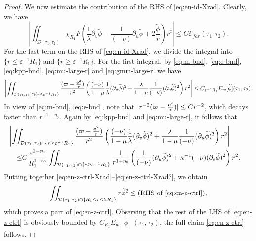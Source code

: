 \documentclass[10pt, reqno]{amsart}
\theoremstyle{definition}
\theoremstyle{remark}
\theoremstyle{conjecture}
\numberwithin{equation}{section}
\newcommand{\abs}[1]{\vert#1\vert}
\newcommand{\set}[1]{\{#1\}}
\newcommand{\rd}{\partial}
\newcommand{\0}{\emptyset}
\newcommand{\veps}{\varepsilon}
\newcommand{\kpp}{\kappa}
\newcommand{\lmb}{\lambda}
\newcommand{\bfe}{{\bf e}}
\newcommand{\calD}{\mathcal D}
\newcommand{\calE}{\mathcal E}
\newcommand{\dur}{\nu}
\newcommand{\dvr}{\lmb}
\newcommand{\e}{\bfe}							%
\newcommand{\phibg}{\overline{\phi}}				%
\newcommand{\phidf}{\widetilde{\phi}}				%
\newcommand{\Abs}[1]{\left\vert #1 \right\vert}
\begin{document}
\begin{proof}
We now estimate the contribution of the RHS of \eqref{eq:en-id-Xrad}. Clearly, we have
\begin{equation} \label{eq:en-z-ctrl-Xrad1}
	\Abs{\iint_{\calD(\tau_{1}, \tau_{2})} \chi_{R_{1}} F \left( \frac{1}{\dvr} \rd_{v} \phidf - \frac{1}{(-\dur)} \rd_{u} \phidf + 2 \frac{\phidf}{r} \right) r^{2} }
	\leq C \calE_{far}(\tau_{1}, \tau_{2}).
\end{equation}
For the last term on the RHS of \eqref{eq:en-id-Xrad}, we divide the integral into $\set{r \leq \veps^{-1} R_{1}}$ and $\set{r \geq \veps^{-1} R_{1}}$. For the first integral, by \eqref{eq:m-bnd}, \eqref{eq:e-bnd}, \eqref{eq:kpp-bnd}, \eqref{eq:mu-large-r} and \eqref{eq:gmm-large-r} we have
\begin{equation} \label{eq:en-z-ctrl-Xrad2}
	\Abs{\iint_{\calD(\tau_{1}, \tau_{2}) \cap \set{r \leq \veps^{-1} R_{1}}} \frac{(\varpi - \frac{\e^{2}}{r})}{r^{2}} \left( \frac{(-\dur)}{1-\mu} \frac{1}{\dvr} (\rd_{v} \phidf)^{2} + \frac{\dvr}{1-\mu} \frac{1}{(-\dur)} (\rd_{u} \phidf)^{2} \right) r^{2}}
	\leq C_{\veps^{-1} R_{1}} E_{w}[\phidf](\tau_{1}, \tau_{2}).
\end{equation}
In view of \eqref{eq:m-bnd}, \eqref{eq:e-bnd}, note that $\abs{r^{-2} (\varpi - \frac{\e^{2}}{r})} \leq C r^{-2}$, which decays faster than $r^{-1-\eta_{0}}$. Again by \eqref{eq:kpp-bnd} and \eqref{eq:mu-large-r}, it follows that
\begin{equation} \label{eq:en-z-ctrl-Xrad3}
\begin{aligned} 
& \hskip-2em
	\Abs{\iint_{\calD(\tau_{1}, \tau_{2}) \cap \set{r \geq \veps^{-1} R_{1}}} \frac{(\varpi - \frac{\e^{2}}{r})}{r^{2}} \left( \frac{(-\dur)}{1-\mu} \frac{1}{\dvr} (\rd_{v} \phidf)^{2} + \frac{\dvr}{1-\mu} \frac{1}{(-\dur)} (\rd_{u} \phidf)^{2} \right) r^{2}} \\
	\leq & C \frac{\veps^{1-\eta_{0}}}{R_{1}^{1-\eta_{0}}} \iint_{\calD(\tau_{1}, \tau_{2}) \cap \set{r \geq \veps^{-1} R_{1}}} \frac{1}{r^{1+\eta_{0}}} 
	\left(  \frac{1}{(-\dur)} (\rd_{u} \phidf)^{2} + \kpp^{-1} (-\dur) (\rd_{v} \phidf)^{2} \right) r^{2}.
\end{aligned}
\end{equation}
Putting together \eqref{eq:en-z-ctrl-Xrad}--\eqref{eq:en-z-ctrl-Xrad3}, we obtain 
\begin{equation*}
\iint_{\calD(\tau_{1}, \tau_{2}) \cap \set{R_{1} \leq r \leq 2 R_{1}}} r \phidf^{2} \leq (\hbox{RHS of \eqref{eq:en-z-ctrl})},
\end{equation*}
which proves a part of \eqref{eq:en-z-ctrl}. Observing that the rest of the LHS of \eqref{eq:en-z-ctrl} is obviously bounded by $C_{R_{1}} E_{w}[\phidf](\tau_{1}, \tau_{2})$, the full claim \eqref{eq:en-z-ctrl} follows.


\end{proof}
\end{document}
